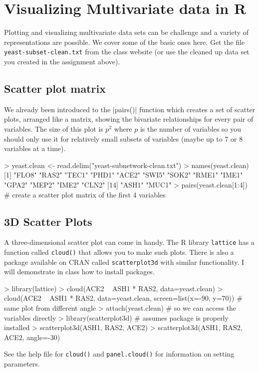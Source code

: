 
\section{Visualizing Multivariate data in R}

Plotting and visualizing multivariate data sets can be challenge and a
variety of representations are possible. We cover some of the basic ones
here. Get the file \lstinline!yeast-subset-clean.txt! from the class
website (or use the cleaned up data set you created in the assignment
above).

\subsection{Scatter plot matrix}


We already been introduced to the |pairs()| function which creates a set of scatter plots, arranged like
a matrix, showing the bivariate relationships for every pair of
variables. The size of this plot is $p^2$ where $p$ is the number of
variables so you should only use it for relatively small subsets of
variables (maybe up to 7 or 8 variables at a time). 

\begin{R}
> yeast.clean <- read.delim("yeast-subnetwork-clean.txt")
> names(yeast.clean)
 [1] "FLO8" "RAS2" "TEC1" "PHD1" "ACE2" "SWI5" "SOK2" "RME1" "IME1" "GPA2" "MEP2" "IME2" "CLN2"
[14] "ASH1" "MUC1"
> pairs(yeast.clean[1:4]) # create a scatter plot matrix of the first 4 variables
\end{R}

\subsection{3D Scatter Plots}

A three-dimensional scatter plot can come in handy. The R library
\lstinline!lattice! has a function called \lstinline!cloud()! that
allows you to make such plots. There is also a package available on CRAN
called \lstinline!scatterplot3d! with similar functionality. I will
demonstrate in class how to install packages.

\begin{R}
> library(lattice)
> cloud(ACE2 ~ ASH1 * RAS2, data=yeast.clean)
> cloud(ACE2 ~ ASH1 * RAS2, data=yeast.clean, screen=list(x=-90, y=70)) # same plot from different angle
> attach(yeast.clean) # so we can access the variables directly
> library(scatterplot3d) # assumes package is properly installed
> scatterplot3d(ASH1, RAS2, ACE2)
> scatterplot3d(ASH1, RAS2, ACE2, angle=-30)
\end{R}
See the help file for \lstinline!cloud()! and \lstinline!panel.cloud()!
for information on setting parameters.

